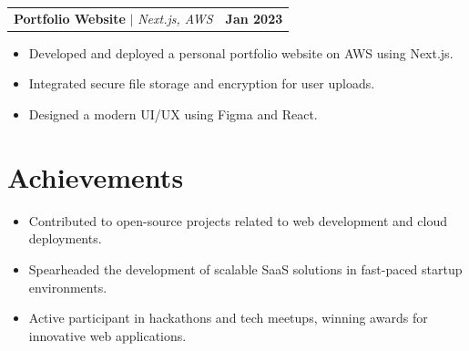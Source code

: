 \documentclass[letterpaper,11pt]{article}
\makeatletter
\newcommand{\resumeProjectHeading}[2]{
    \item
    \begin{tabular*}{1.001\textwidth}{l@{\extracolsep{\fill}}r}
      \small#1 & \textbf{\small #2}\\
    \end{tabular*}\vspace{-7pt}
}
\makeatother
\begin{document}
\resumeProjectHeading
{\textbf{Portfolio Website} $|$ \emph{Next.js, AWS}}{Jan 2023}
\begin{itemize}
\item Developed and deployed a personal portfolio website on AWS using Next.js.
\item Integrated secure file storage and encryption for user uploads.
\item Designed a modern UI/UX using Figma and React.
\end{itemize}

\section{Achievements}
\begin{itemize}
\item Contributed to open-source projects related to web development and cloud deployments.
\item Spearheaded the development of scalable SaaS solutions in fast-paced startup environments.
\item Active participant in hackathons and tech meetups, winning awards for innovative web applications.
\end{itemize}
\end{document}
